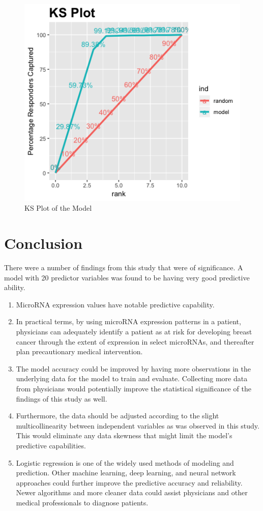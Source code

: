 \documentclass{bioinfo}
\begin{document}
\begin{figure}[htbp]
\centering
\includegraphics[scale=0.55]{KS-Plot.png}
\caption{KS Plot of the Model}
\label{fig:KSPlot}
\end{figure}


\section{Conclusion}

There were a number of findings from this study that were of significance.  A model with 20 predictor variables was found to be having very good predictive ability.
\begin{enumerate}
  \item MicroRNA expression values have notable predictive capability. 

  \item In practical terms, by using microRNA expression patterns in a patient, physicians can adequately identify a patient as at risk for developing breast cancer through the extent of expression in select microRNAs, and thereafter plan precautionary medical intervention. 

  \item The model accuracy could be improved by having more observations in the underlying data for the model to train and evaluate. Collecting more data from physicians would potentially improve the statistical significance of the findings of this study as well.

  \item Furthermore, the data should be adjusted according to the slight multicollinearity between independent variables as was observed in this study. This  would  eliminate  any  data  skewness  that  might  limit  the model’s predictive capabilities.
  \item Logistic regression is one of the widely used methods of modeling and prediction. Other machine learning, deep learning, and neural network approaches could further improve the predictive accuracy and reliability.  Newer algorithms and more cleaner data could assist physicians and other medical professionals to diagnose patients. 
\end{enumerate}
\end{document}
